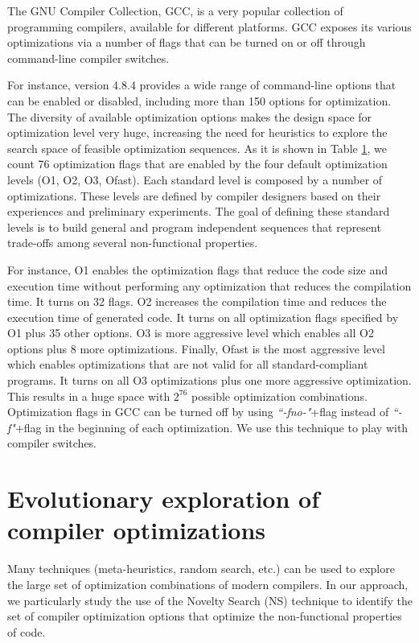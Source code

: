 \begin{table}
{\begin{tabular}[c]{|c|p{7cm}||c|p{7cm}|}
		\end{tabular}
	}
	\label{tab:Compiler optimization options}
	
\end{table}

The GNU Compiler Collection, GCC, is a very popular collection of programming compilers, available for different platforms.
GCC exposes its various optimizations via a number of flags that can be turned on or off through command-line compiler switches. 

For instance, version 4.8.4 provides a wide range of command-line options that can be enabled or disabled, including more than 150 options for optimization. The diversity of available optimization options makes the design space for optimization level very huge, increasing the need for heuristics to explore the search space of feasible optimization sequences.
As it is shown in Table \ref{tab:Compiler optimization options}, we count 76 optimization flags that are enabled by the four default optimization levels (O1, O2, O3, Ofast). 
Each standard level is composed by a number of optimizations. These levels are defined by compiler designers based on their experiences and preliminary experiments. The goal of defining these standard levels is to build general and program independent sequences that represent trade-offs among several non-functional properties.

For instance, O1 enables the optimization flags that reduce the code size and execution time without performing any optimization that reduces the compilation time. It turns on 32 flags. 
O2 increases the compilation time and reduces the execution time of generated code. It turns on all optimization flags specified by O1 plus 35 other options. 
O3 is more aggressive level which enables all O2 options plus 8 more optimizations. 
Finally, Ofast is the most aggressive level which enables optimizations that are not valid for all standard-compliant programs. It turns on all O3 optimizations plus one more aggressive optimization. 
This results in a huge space with $2^{76}$ possible optimization combinations.
Optimization flags in GCC can be turned off by using \textit{``-fno-"}+flag instead of \textit{``-f"}+flag in the beginning of each optimization. 
We use this technique to play with compiler switches.



\section{Evolutionary exploration of compiler optimizations}
\label{sec:comp-NS}
Many techniques (meta-heuristics, random search, etc.) can be used to explore the large set of optimization combinations of modern compilers. 
In our approach, we particularly study the use of the Novelty Search (NS) technique to identify the set of compiler optimization options that optimize the non-functional properties of code.

